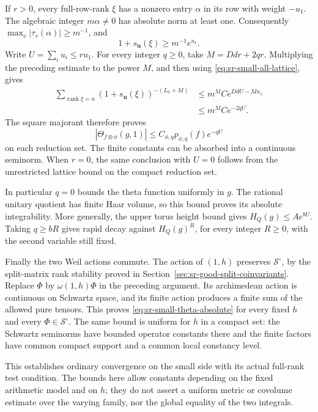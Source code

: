 If \(r>0\), every full-row-rank \(\xi\) has a nonzero
entry \(\alpha\) in its row with weight \(-u_1\).
The algebraic integer \(m\alpha\ne0\) has absolute norm
at least one. Consequently
\(\max_v|\tau_v(\alpha)|\ge m^{-1}\), and
\[
              1+s_{\mathbf u}(\xi)\ge m^{-1}e^{u_1}.
\]
Write \(U=\sum_i u_i\le r u_1\).
For every integer \(q\ge0\), take
\(M=Ddr+2qr\). Multiplying the preceding estimate to
the power \(M\), and then using
\eqref{eq:sr-small-all-lattice}, gives
\[
 \begin{split}
 \sum_{\operatorname{rank}\xi=n}
       (1+s_{\mathbf u}(\xi))^{-(L_0+M)}
 &\le m^M C e^{DdU-Mu_1}\\
 &\le m^M C e^{-2qU}.
 \end{split}
\]
The square majorant therefore proves
\[
           |\Theta_{f\otimes\phi}(g,1)|
                        \le C_{\phi,q}p_{\phi,q}(f)e^{-qU}
\]
on each reduction set. The finite constants can be
absorbed into a continuous seminorm. When \(r=0\),
the same conclusion with \(U=0\) follows from the
unrestricted lattice bound on the compact reduction set.

In particular \(q=0\) bounds the theta function uniformly
in \(g\). The rational unitary quotient has finite
Haar volume, so this bound proves its absolute
integrability. More generally, the upper torus height
bound gives \(H_Q(g)\le A e^{bU}\). Taking \(q\ge bR\)
gives rapid decay against \(H_Q(g)^R\), for every
integer \(R\ge0\), with the second variable still fixed.

Finally the two Weil actions commute. The action of
\((1,h)\) preserves \(\mathcal S^\circ\), by the
split-matrix rank stability proved in
Section~\ref{sec:sr-good-split-coinvariants}.
Replace \(\Phi\) by \(\omega(1,h)\Phi\) in the preceding
argument. Its archimedean action is continuous on
Schwartz space, and its finite action produces a finite
sum of the allowed pure tensors. This proves
\eqref{eq:sr-small-theta-absolute} for every fixed \(h\)
and every \(\Phi\in\mathcal S^\circ\).
The same bound is uniform for \(h\) in a compact set:
the Schwartz seminorms have bounded operator constants
there and the finite factors have common compact support
and a common local constancy level.

This establishes ordinary convergence on the small side
with its actual full-rank test condition.
The bounds here allow constants depending on the fixed
arithmetic model and on \(h\); they do not assert
a uniform metric or covolume estimate over the varying
family, nor the global equality of the two integrals.

